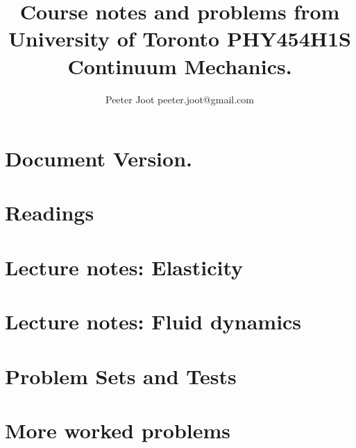 \documentclass[12pt,leqno]{book}
\begin{document}

\title{Course notes and problems from\\University of Toronto PHY454H1S\\Continuum Mechanics.}
\author{Peeter Joot \quad peeter.joot@gmail.com}

\maketitle

\clearpage{}
\tableofcontents

\clearpage{}

\pagestyle{plain}



\part{Document Version.}


\part{Readings}


\part{Lecture notes: Elasticity}








\part{Lecture notes: Fluid dynamics}













\part{Problem Sets and Tests}




\part{More worked problems}




\end{document}
